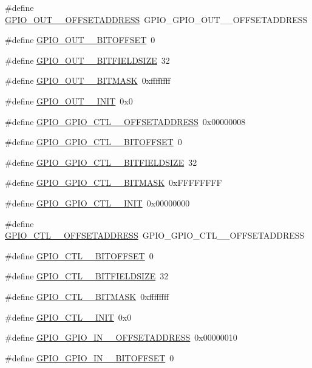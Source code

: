 \begin{DoxyCompactItemize}
\item 
\#define \hyperlink{a00553_ae3b65876b30e8519e5bf10fd352fe39c}{GPIO\_\-OUT\_\_\-OFFSETADDRESS}~GPIO\_\-GPIO\_\-OUT\_\_\-OFFSETADDRESS
\item 
\#define \hyperlink{a00553_af9f8890b4ceaa59b29fc6fa7d6d3ddcd}{GPIO\_\-OUT\_\_\-BITOFFSET}~0
\item 
\#define \hyperlink{a00553_abb7a74dace657e8dd101fe97862c7f4f}{GPIO\_\-OUT\_\_\-BITFIELDSIZE}~32
\item 
\#define \hyperlink{a00553_ae60a1818bb592695efc8e44d8579c0fa}{GPIO\_\-OUT\_\_\-BITMASK}~0xffffffff
\item 
\#define \hyperlink{a00553_add2b0785b1679fc5f3f05cfee3c6731f}{GPIO\_\-OUT\_\_\-INIT}~0x0
\item 
\#define \hyperlink{a00553_a7a4b1b48349423a061e286c898656c99}{GPIO\_\-GPIO\_\-CTL\_\_\-OFFSETADDRESS}~0x00000008
\item 
\#define \hyperlink{a00553_af1a52abbb485a7000a3bf3955e8f48ef}{GPIO\_\-GPIO\_\-CTL\_\_\-BITOFFSET}~0
\item 
\#define \hyperlink{a00553_acb2d33fc9e30401f0003f0d6a2ed5814}{GPIO\_\-GPIO\_\-CTL\_\_\-BITFIELDSIZE}~32
\item 
\#define \hyperlink{a00553_abe490f433f4a906c6c8f6ac560ba9e01}{GPIO\_\-GPIO\_\-CTL\_\_\-BITMASK}~0xFFFFFFFF
\item 
\#define \hyperlink{a00553_a348821007807fc28d0942a3fe1720567}{GPIO\_\-GPIO\_\-CTL\_\_\-INIT}~0x00000000
\item 
\#define \hyperlink{a00553_af519844b13cb8394785848c346179798}{GPIO\_\-CTL\_\_\-OFFSETADDRESS}~GPIO\_\-GPIO\_\-CTL\_\_\-OFFSETADDRESS
\item 
\#define \hyperlink{a00553_afb352681628b1201441a3cba6da15c96}{GPIO\_\-CTL\_\_\-BITOFFSET}~0
\item 
\#define \hyperlink{a00553_aa607fcf8985eb9c8bfd679a99ac44fc3}{GPIO\_\-CTL\_\_\-BITFIELDSIZE}~32
\item 
\#define \hyperlink{a00553_a3c0780741ae88664cc8552d7e03f5ce0}{GPIO\_\-CTL\_\_\-BITMASK}~0xffffffff
\item 
\#define \hyperlink{a00553_ab08bdaddc99191ff5a64d1f0acb8dd2a}{GPIO\_\-CTL\_\_\-INIT}~0x0
\item 
\#define \hyperlink{a00553_a303845e988a5efe8df39564ee80a1406}{GPIO\_\-GPIO\_\-IN\_\_\-OFFSETADDRESS}~0x00000010
\item 
\#define \hyperlink{a00553_a2e7ef731f4b2b55f2a2f82b6c58b8986}{GPIO\_\-GPIO\_\-IN\_\_\-BITOFFSET}~0

\end{DoxyCompactItemize}
